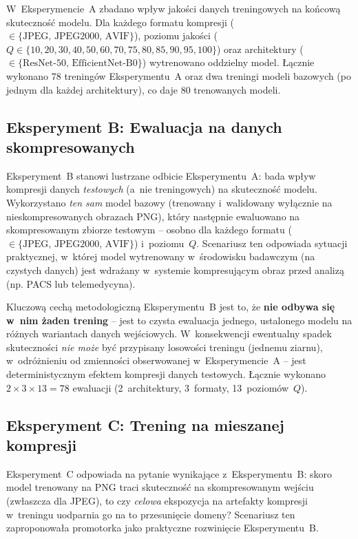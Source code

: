 \documentclass[12pt,a4paper]{article}
\begin{document}
W~Eksperymencie~A zbadano wpływ jakości danych treningowych na końcową skuteczność modelu. Dla każdego formatu kompresji ($\in \{\text{JPEG, JPEG2000, AVIF}\}$), poziomu jakości ($Q \in \{10, 20, 30, 40, 50, 60, 70, 75, 80, 85, 90, 95, 100\}$) oraz architektury ($\in \{\text{ResNet-50, EfficientNet-B0}\}$) wytrenowano oddzielny model. Łącznie wykonano 78 treningów Eksperymentu~A oraz dwa treningi modeli bazowych (po jednym dla każdej architektury), co daje 80 trenowanych modeli.

\subsection{Eksperyment B: Ewaluacja na danych skompresowanych}
\label{sec:exp_b_setup}

Eksperyment~B stanowi lustrzane odbicie Eksperymentu~A: bada wpływ kompresji danych \emph{testowych} (a~nie treningowych) na skuteczność modelu. Wykorzystano \emph{ten sam} model bazowy (trenowany i~walidowany wyłącznie na nieskompresowanych obrazach PNG), który następnie ewaluowano na skompresowanym zbiorze testowym -- osobno dla każdego formatu ($\in \{\text{JPEG, JPEG2000, AVIF}\}$) i~poziomu~$Q$. Scenariusz ten odpowiada sytuacji praktycznej, w~której model wytrenowany w~środowisku badawczym (na czystych danych) jest wdrażany w~systemie kompresującym obraz przed analizą (np. PACS lub telemedycyna).

Kluczową cechą metodologiczną Eksperymentu~B jest to, że \textbf{nie odbywa się w~nim żaden trening} -- jest to czysta ewaluacja jednego, ustalonego modelu na różnych wariantach danych wejściowych. W~konsekwencji ewentualny spadek skuteczności \emph{nie może} być przypisany losowości treningu (jednemu ziarnu), w~odróżnieniu od zmienności obserwowanej w~Eksperymencie~A -- jest deterministycznym efektem kompresji danych testowych. Łącznie wykonano $2 \times 3 \times 13 = 78$ ewaluacji (2~architektury, 3~formaty, 13~poziomów~$Q$).

\subsection{Eksperyment C: Trening na mieszanej kompresji}
\label{sec:exp_c_setup}

Eksperyment~C odpowiada na pytanie wynikające z~Eksperymentu~B: skoro model trenowany na PNG traci skuteczność na skompresowanym wejściu (zwłaszcza dla JPEG), to czy \emph{celowa} ekspozycja na artefakty kompresji w~treningu uodparnia go na to przesunięcie domeny? Scenariusz ten zaproponowała promotorka jako praktyczne rozwinięcie Eksperymentu~B.
\end{document}

